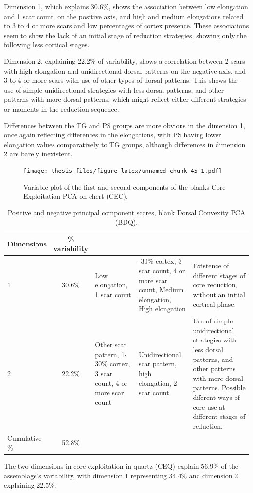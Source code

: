 \documentclass[12pt,twoside]{reedthesis}
\begin{document}
Dimension 1, which explains 30.6\%, shows the association between low elongation and 1 scar count, on the positive axis, and high and medium elongations related to 3 to 4 or more scars and low percentages of cortex presence. These associations seem to show the lack of an initial stage of reduction strategies, showing only the following less cortical stages.

Dimension 2, explaining 22.2\% of variability, shows a correlation between 2 scars with high elongation and unidirectional dorsal patterns on the negative axis, and 3 to 4 or more scars with use of other types of dorsal patterns. This shows the use of simple unidirectional strategies with less dorsal patterns, and other patterns with more dorsal patterns, which might reflect either different strategies or moments in the reduction sequence.

Differences between the TG and PS groups are more obvious in the dimension 1, once again reflecting differences in the elongations, with PS having lower elongation values comparatively to TG groups, although differences in dimension 2 are barely inexistent.
\begin{figure}
\centering
\texttt{[image: thesis\_files/figure-latex/unnamed-chunk-45-1.pdf]}
\caption{\label{fig:unnamed-chunk-45}Variable plot of the first and second components of the blanks Core Exploitation PCA on chert (CEC).}
\end{figure}
\begin{table}

\caption{\label{tab:unnamed-chunk-46}Positive and negative principal component scores, blank Dorsal Convexity PCA (BDQ).}
\centering
\begin{tabular}[t]{lc>{\raggedright\arraybackslash}p{3cm}>{\raggedright\arraybackslash}p{3cm}>{\raggedright\arraybackslash}p{3cm}}
\toprule
\multicolumn{1}{c}{\textbf{Dimensions}} & \multicolumn{1}{c}{\textbf{\% variability}} & \multicolumn{1}{>{\centering\arraybackslash}p{3cm}}{\textbf{+}} & \multicolumn{1}{>{\centering\arraybackslash}p{3cm}}{\textbf{-}} & \multicolumn{1}{>{\centering\arraybackslash}p{3cm}}{\textbf{Interpretation}}\\
\midrule
1 & 30.6\% & Low elongation, 1 scar count & 1-30\% cortex, 3 scar count, 4 or more scar count, Medium elongation, High elongation & Existence of different stages of core reduction, without an initial cortical phase.\\
2 & 22.2\% & Other scar pattern, 1-30\% cortex, 3 scar count, 4 or more scar count & Unidirectional scar pattern, high elongation, 2 scar count & Use of simple unidirectional strategies with less dorsal patterns, and other patterns with more dorsal patterns. Possible diferent ways of core use at different stages of reduction.\\
Cumulative \% & 52.8\% &  &  & \\
\bottomrule
\end{tabular}
\end{table}
The two dimensions in core exploitation in quartz (CEQ) explain 56.9\% of the assemblage's variability, with dimension 1 representing 34.4\% and dimension 2 explaining 22.5\%.
\end{document}
